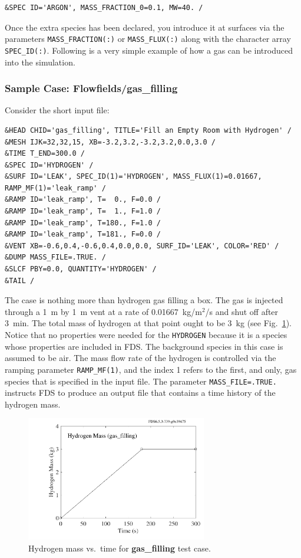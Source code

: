 \documentclass[11pt]{book}
\newcommand{\ct}{\tt\small}
\begin{document}
\footnotesize
\begin{verbatim}
&SPEC ID='ARGON', MASS_FRACTION_0=0.1, MW=40. /
\end{verbatim}
\normalsize

\noindent
Once the extra species has been declared, you introduce it at surfaces via the
parameters {\ct MASS\_FRACTION(:)} or {\ct MASS\_FLUX(:)} along with the character array {\ct SPEC\_ID(:)}.
Following is a very simple example of how a gas can be introduced into the simulation.


\subsubsection{Sample Case: Flowfields/gas\_filling}

Consider the short input file:

\footnotesize
\begin{verbatim}
&HEAD CHID='gas_filling', TITLE='Fill an Empty Room with Hydrogen' /
&MESH IJK=32,32,15, XB=-3.2,3.2,-3.2,3.2,0.0,3.0 /
&TIME T_END=300.0 /
&SPEC ID='HYDROGEN' /
&SURF ID='LEAK', SPEC_ID(1)='HYDROGEN', MASS_FLUX(1)=0.01667, RAMP_MF(1)='leak_ramp' /
&RAMP ID='leak_ramp', T=  0., F=0.0 /
&RAMP ID='leak_ramp', T=  1., F=1.0 /
&RAMP ID='leak_ramp', T=180., F=1.0 /
&RAMP ID='leak_ramp', T=181., F=0.0 /
&VENT XB=-0.6,0.4,-0.6,0.4,0.0,0.0, SURF_ID='LEAK', COLOR='RED' /
&DUMP MASS_FILE=.TRUE. /
&SLCF PBY=0.0, QUANTITY='HYDROGEN' /
&TAIL /
\end{verbatim}
\normalsize

\noindent
The case is nothing more than hydrogen gas filling a box. The gas is injected through a 1~m by 1~m vent
at a rate of 0.01667~kg/m$^2$/s and shut off after 3~min. The total mass of hydrogen at that point ought to be
3~kg (see Fig.~\ref{gas_filling}). Notice that no properties were needed for the {\ct HYDROGEN} because it is
a species whose properties are included in FDS. The background species in this case is
assumed to be air. The mass flow rate of the hydrogen is controlled via the ramping parameter {\ct RAMP\_MF(1)}, and
the index 1 refers to the first, and only, gas species that is specified in the input file. The parameter
{\ct MASS\_FILE=.TRUE.} instructs FDS to produce an output file that contains a time history of the hydrogen mass.
\begin{figure}[h!]
\begin{center}
\includegraphics[width=3.1in]{SCRIPT_FIGURES/gas_filling_mass}
\end{center}
\caption[Example of gas filling.]{Hydrogen mass vs.~time for {\bf gas\_filling} test case.}
\label{gas_filling}
\end{figure}
\end{document}
